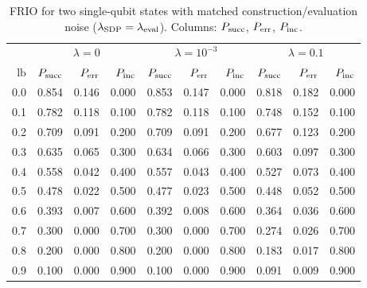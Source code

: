 \begin{table}[t]
    \centering
    \caption{FRIO for two single-qubit states with matched construction/evaluation noise (\(\lambda_{\mathrm{SDP}}=\lambda_{\mathrm{eval}}\)). Columns: \(P_{\mathrm{succ}}\), \(P_{\mathrm{err}}\), \(P_{\mathrm{inc}}\).}
    \label{tab:frio_two_states}
    \footnotesize
    \setlength{\tabcolsep}{4pt}%
    \renewcommand{\arraystretch}{1.08}%
    \begin{tabular}{@{}r|rrr|rrr|rrr@{}}
        \toprule
                                                 & \multicolumn{3}{c|}{\(\lambda=0\)} &
        \multicolumn{3}{c|}{\(\lambda=10^{-3}\)} &
        \multicolumn{3}{c}{\(\lambda=0.1\)}                                                                                                                   \\
        \(\text{lb}\)                            & \(P_{\mathrm{succ}}\)                         & \(P_{\mathrm{err}}\) & \(P_{\mathrm{inc}}\) &
        \(P_{\mathrm{succ}}\)                               & \(P_{\mathrm{err}}\)                          & \(P_{\mathrm{inc}}\) &
        \(P_{\mathrm{succ}}\)                               & \(P_{\mathrm{err}}\)                          & \(P_{\mathrm{inc}}\)                                                             \\
        \midrule
        0.0                                      & 0.854                              & 0.146     & 0.000     & 0.853 & 0.147 & 0.000 & 0.818 & 0.182 & 0.000 \\
        0.1                                      & 0.782                              & 0.118     & 0.100     & 0.782 & 0.118 & 0.100 & 0.748 & 0.152 & 0.100 \\
        0.2                                      & 0.709                              & 0.091     & 0.200     & 0.709 & 0.091 & 0.200 & 0.677 & 0.123 & 0.200 \\
        0.3                                      & 0.635                              & 0.065     & 0.300     & 0.634 & 0.066 & 0.300 & 0.603 & 0.097 & 0.300 \\
        0.4                                      & 0.558                              & 0.042     & 0.400     & 0.557 & 0.043 & 0.400 & 0.527 & 0.073 & 0.400 \\
        0.5                                      & 0.478                              & 0.022     & 0.500     & 0.477 & 0.023 & 0.500 & 0.448 & 0.052 & 0.500 \\
        0.6                                      & 0.393                              & 0.007     & 0.600     & 0.392 & 0.008 & 0.600 & 0.364 & 0.036 & 0.600 \\
        0.7                                      & 0.300                              & 0.000     & 0.700     & 0.300 & 0.000 & 0.700 & 0.274 & 0.026 & 0.700 \\
        0.8                                      & 0.200                              & 0.000     & 0.800     & 0.200 & 0.000 & 0.800 & 0.183 & 0.017 & 0.800 \\
        0.9                                      & 0.100                              & 0.000     & 0.900     & 0.100 & 0.000 & 0.900 & 0.091 & 0.009 & 0.900 \\
        \bottomrule
    \end{tabular}


\end{table}
